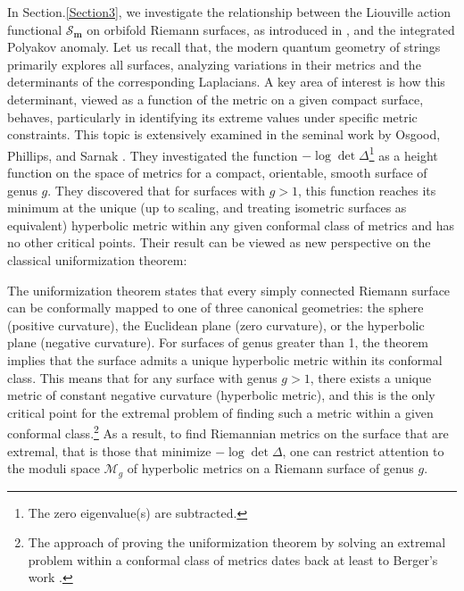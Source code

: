 \documentclass[a4paper,11pt]{article}
\newcommand{\moduli}{\mathcal{M}}
\newcommand{\Gpotential}{\mathscr{S}}
\begin{document}
In Section.\hspace{.5mm}\ref{Section3}, we investigate the relationship between the Liouville action functional $\Gpotential_{\boldsymbol{m}}$ on orbifold Riemann surfaces, as introduced in \cite{Taghavi2024classical}, and the integrated Polyakov anomaly. Let us recall that, the modern quantum geometry of strings primarily explores all surfaces, analyzing variations in their metrics and the determinants of the corresponding Laplacians. A key area of interest is how this determinant, viewed as a function of the metric on a given compact surface, behaves, particularly in identifying its extreme values under specific metric constraints. This topic is extensively examined in the seminal work by Osgood, Phillips, and Sarnak \cite{osgood1988extremals}. They investigated the function $-\log\det\Delta$\footnote{The zero eigenvalue(s) are subtracted.} as a height function on the space of metrics for a compact, orientable, smooth surface of genus $g$. They discovered that for surfaces with $g> 1$, this function reaches its minimum at the unique (up to scaling, and treating isometric surfaces as equivalent) hyperbolic metric within any given conformal class of metrics and has no other critical points. Their result can be viewed as new perspective on the classical uniformization theorem: 

The uniformization theorem states that every simply connected Riemann surface can be conformally mapped to one of three canonical geometries: the sphere (positive curvature), the Euclidean plane (zero curvature), or the hyperbolic plane (negative curvature). For surfaces of genus greater than 1, the theorem implies that the surface admits a unique hyperbolic metric within its conformal class. This means that for any surface with genus 
$g > 1$, there exists a unique metric of constant negative curvature (hyperbolic metric), and this is the only critical point for the extremal problem of finding such a metric within a given conformal class.\footnote{The approach of proving the uniformization theorem by solving an extremal problem within a conformal class of metrics dates back at least to Berger's work \cite{berger1971riemannian}.}  As a result, to find Riemannian metrics on the surface that are extremal, that is those that minimize $-\log\det\Delta$, one can restrict attention to the moduli space $\moduli_{g}$  of hyperbolic metrics on a Riemann surface of genus $g$. 
\end{document}
